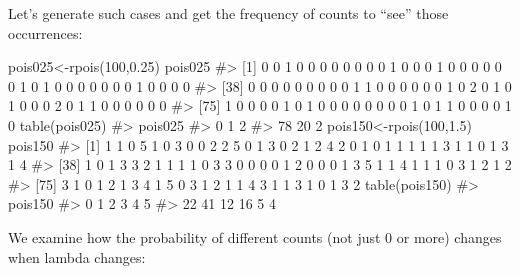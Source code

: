 \documentclass[
  letterpaper,
  DIV=11,
  numbers=noendperiod]{scrreprt}
\newenvironment{Shaded}{\begin{snugshade}}{\end{snugshade}}
\newcommand{\CommentTok}[1]{\textcolor[rgb]{0.37,0.37,0.37}{#1}}
\newcommand{\DecValTok}[1]{\textcolor[rgb]{0.68,0.00,0.00}{#1}}
\newcommand{\FloatTok}[1]{\textcolor[rgb]{0.68,0.00,0.00}{#1}}
\newcommand{\FunctionTok}[1]{\textcolor[rgb]{0.28,0.35,0.67}{#1}}
\newcommand{\NormalTok}[1]{\textcolor[rgb]{0.00,0.23,0.31}{#1}}
\newcommand{\OtherTok}[1]{\textcolor[rgb]{0.00,0.23,0.31}{#1}}
\begin{document}
Let's generate such cases and get the frequency of counts to ``see''
those occurrences:

\begin{Shaded}
\begin{Highlighting}[]
\NormalTok{pois025}\OtherTok{\textless{}{-}}\FunctionTok{rpois}\NormalTok{(}\DecValTok{100}\NormalTok{,}\FloatTok{0.25}\NormalTok{)}
\NormalTok{pois025}
\CommentTok{\#\textgreater{}   [1] 0 0 1 0 0 0 0 0 0 0 0 1 0 0 0 1 0 0 0 0 0 0 1 0 1 0 0 0 0 0 0 0 1 0 0 0 0}
\CommentTok{\#\textgreater{}  [38] 0 0 0 0 0 0 0 0 0 1 1 0 0 0 0 0 0 1 0 2 0 1 0 1 0 0 0 2 0 1 1 0 0 0 0 0 0}
\CommentTok{\#\textgreater{}  [75] 1 0 0 0 0 1 0 1 0 0 0 0 0 0 0 0 1 0 1 1 0 0 0 0 1 0}
\FunctionTok{table}\NormalTok{(pois025)}
\CommentTok{\#\textgreater{} pois025}
\CommentTok{\#\textgreater{}  0  1  2 }
\CommentTok{\#\textgreater{} 78 20  2}
\NormalTok{pois150}\OtherTok{\textless{}{-}}\FunctionTok{rpois}\NormalTok{(}\DecValTok{100}\NormalTok{,}\FloatTok{1.5}\NormalTok{)}
\NormalTok{pois150}
\CommentTok{\#\textgreater{}   [1] 1 1 0 5 1 0 3 0 0 2 2 5 0 1 3 0 2 1 2 4 2 0 1 0 1 1 1 1 1 3 1 1 0 1 3 1 4}
\CommentTok{\#\textgreater{}  [38] 1 0 1 3 3 2 1 1 1 1 0 3 3 0 0 0 0 1 2 0 0 0 1 3 5 1 1 4 1 1 1 0 3 1 2 1 2}
\CommentTok{\#\textgreater{}  [75] 3 1 0 1 2 1 3 4 1 5 0 3 1 2 1 1 4 3 1 1 3 1 0 1 3 2}
\FunctionTok{table}\NormalTok{(pois150)}
\CommentTok{\#\textgreater{} pois150}
\CommentTok{\#\textgreater{}  0  1  2  3  4  5 }
\CommentTok{\#\textgreater{} 22 41 12 16  5  4}
\end{Highlighting}
\end{Shaded}

We examine how the probability of different counts (not just 0 or more)
changes when lambda changes:
\end{document}
